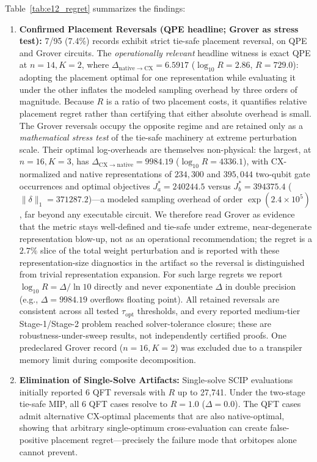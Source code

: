 \documentclass[11pt]{article}
\begin{document}
Table~\ref{tab:e12_regret} summarizes the findings:
\begin{enumerate}
  \item \textbf{Confirmed Placement Reversals (QPE headline; Grover as stress test):} 7/95 (7.4\%) records exhibit strict tie-safe placement reversal, on QPE and Grover circuits. The \emph{operationally relevant} headline witness is exact QPE at $n=14, K=2$, where $\Delta_{\mathrm{native}\to\mathrm{CX}} = 6.5917$ ($\log_{10} R = 2.86$, $R=729.0$): adopting the placement optimal for one representation while evaluating it under the other inflates the modeled sampling overhead by three orders of magnitude. Because $R$ is a ratio of two placement costs, it quantifies relative placement regret rather than certifying that either absolute overhead is small. The Grover reversals occupy the opposite regime and are retained only as a \emph{mathematical stress test} of the tie-safe machinery at extreme perturbation scale. Their optimal log-overheads are themselves non-physical: the largest, at $n=16, K=3$, has $\Delta_{\mathrm{CX}\to\mathrm{native}} = 9984.19$ ($\log_{10} R = 4336.1$), with CX-normalized and native representations of $234{,}300$ and $395{,}044$ two-qubit gate occurrences and optimal objectives $J_a^*=240244.5$ versus $J_b^*=394375.4$ ($\|\delta\|_1=371287.2$)---a modeled sampling overhead of order $\exp(2.4\times10^5)$, far beyond any executable circuit. We therefore read Grover as evidence that the metric stays well-defined and tie-safe under extreme, near-degenerate representation blow-up, not as an operational recommendation; the regret is a $2.7\%$ slice of the total weight perturbation and is reported with these representation-size diagnostics in the artifact so the reversal is distinguished from trivial representation expansion. For such large regrets we report $\log_{10}R=\Delta/\ln10$ directly and never exponentiate $\Delta$ in double precision (e.g., $\Delta=9984.19$ overflows floating point). All retained reversals are consistent across all tested $\tau_{\mathrm{opt}}$ thresholds, and every reported medium-tier Stage-1/Stage-2 problem reached solver-tolerance closure; these are robustness-under-sweep results, not independently certified proofs. One predeclared Grover record ($n=16, K=2$) was excluded due to a transpiler memory limit during composite decomposition.

  \item \textbf{Elimination of Single-Solve Artifacts:} Single-solve SCIP evaluations initially reported 6 QFT reversals with $R$ up to 27,741. Under the two-stage tie-safe MIP, all 6 QFT cases resolve to $R=1.0$ ($\Delta=0.0$). The QFT cases admit alternative CX-optimal placements that are also native-optimal, showing that arbitrary single-optimum cross-evaluation can create false-positive placement regret---precisely the failure mode that orbitopes alone cannot prevent.


\end{enumerate}
\end{document}
